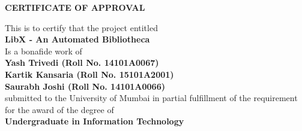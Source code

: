 \documentclass[a4paper,12pt]{report}
\begin{document}
\begin{center}
\vspace*{0.25cm}
  {\centering \onehalfspacing
    {\large\textbf{CERTIFICATE OF APPROVAL}}\\
        \vspace{1cm}\onehalfspacing

        This is to certify that the project entitled \\
        {\large\textbf{LibX - An Automated Bibliotheca}}\\
        \vspace{0.5cm}
        Is a bonafide work of\\
        {\large\textbf{Yash Trivedi (Roll No. 14101A0067)}}\\
        {\large \textbf {Kartik Kansaria (Roll No. 15101A2001)}}\\
        {\large \textbf {Saurabh Joshi (Roll No. 14101A0066)}}\\
        \vspace{0.5cm}
        submitted to the University of Mumbai in partial fulfillment of the requirement for the award of the degree of\\
        \vspace{0.5cm}
        {\large\textbf{Undergraduate in Information Technology}}\\
        \vspace{3cm}
        \flushleft{}
        \hspace{3cm}
        \hspace{3cm}
  }
\end{center}


\pagebreak
\end{document}

